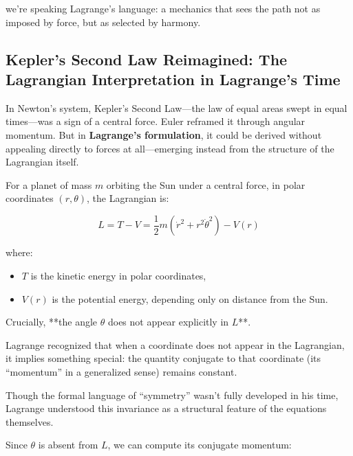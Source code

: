 we’re speaking Lagrange’s language: a mechanics that sees the path not as imposed by force, but as selected by harmony.


\subsection{Kepler’s Second Law Reimagined: The Lagrangian Interpretation in Lagrange’s Time}

In Newton’s system, Kepler’s Second Law—the law of equal areas swept in equal times—was a sign of a central force. Euler reframed it through angular momentum. But in \textbf{Lagrange’s formulation}, it could be derived without appealing directly to forces at all—emerging instead from the structure of the Lagrangian itself.

\medskip

For a planet of mass \( m \) orbiting the Sun under a central force, in polar coordinates \( (r, \theta) \), the Lagrangian is:

\[
L = T - V = \frac{1}{2} m (\dot{r}^2 + r^2 \dot{\theta}^2) - V(r)
\]

where:

\begin{itemize}
    \item \( T \) is the kinetic energy in polar coordinates,
    \item \( V(r) \) is the potential energy, depending only on distance from the Sun.
\end{itemize}

Crucially, **the angle \( \theta \) does not appear explicitly in \( L \)**.

\begin{tcolorbox}[colback=gray!5!white, colframe=black, title=\textbf{Historical Sidebar: A Coordinate “Missing” from the Equation}, fonttitle=\bfseries, arc=1.5mm, boxrule=0.4pt]

Lagrange recognized that when a coordinate does not appear in the Lagrangian, it implies something special: the quantity conjugate to that coordinate (its “momentum” in a generalized sense) remains constant.

Though the formal language of “symmetry” wasn’t fully developed in his time, Lagrange understood this invariance as a structural feature of the equations themselves.

\end{tcolorbox}

Since \( \theta \) is absent from \( L \), we can compute its conjugate momentum:

